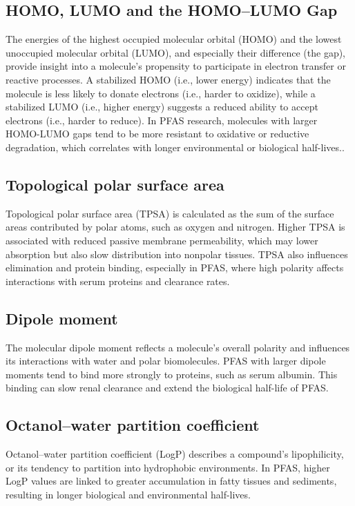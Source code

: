 \subsection{HOMO, LUMO and the HOMO–LUMO Gap}
The energies of the highest occupied molecular orbital (HOMO) and the lowest unoccupied molecular orbital (LUMO), and especially their difference (the gap), provide insight into a molecule’s propensity to participate in electron transfer or reactive processes. A stabilized HOMO (i.e., lower energy) indicates that the molecule is less likely to donate electrons (i.e., harder to oxidize), while a stabilized LUMO (i.e., higher energy) suggests a reduced ability to accept electrons (i.e., harder to reduce). In PFAS research, molecules with larger HOMO-LUMO gaps tend to be more resistant to oxidative or reductive degradation, which correlates with longer environmental or biological half-lives.\cite{EPA2023}.

\subsection{Topological polar surface area}

Topological polar surface area (TPSA) is calculated as the sum of the surface areas contributed by polar atoms, such as oxygen and nitrogen. Higher TPSA is associated with reduced passive membrane permeability, which may lower absorption but also slow distribution into nonpolar tissues. TPSA also influences elimination and protein binding, especially in PFAS, where high polarity affects interactions with serum proteins and clearance rates.\cite{Ryu2024}

\subsection{Dipole moment}

The molecular dipole moment reflects a molecule’s overall polarity and influences its interactions with water and polar biomolecules. PFAS with larger dipole moments tend to bind more strongly to proteins, such as serum albumin. This binding can slow renal clearance and extend the biological half-life of PFAS. \cite{PengXu2024}

\subsection{Octanol–water partition coefficient}

Octanol–water partition coefficient (LogP) describes a compound’s lipophilicity, or its tendency to partition into hydrophobic environments. In PFAS, higher LogP values are linked to greater accumulation in fatty tissues and sediments, resulting in longer biological and environmental half-lives. \cite{Qiu2020}

